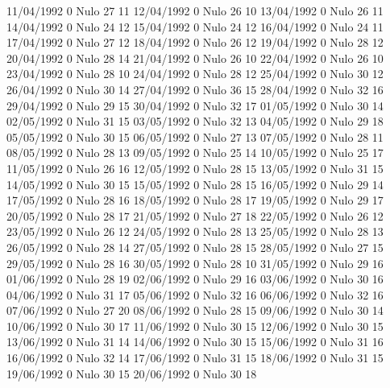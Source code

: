 11/04/1992  0     Nulo    27     11 
12/04/1992  0     Nulo    26     10 
13/04/1992  0     Nulo    26     11 
14/04/1992  0     Nulo    24     12 
15/04/1992  0     Nulo    24     12 
16/04/1992  0     Nulo    24     11 
17/04/1992  0     Nulo    27     12 
18/04/1992  0     Nulo    26     12 
19/04/1992  0     Nulo    28     12 
20/04/1992  0     Nulo    28     14 
21/04/1992  0     Nulo    26     10 
22/04/1992  0     Nulo    26     10 
23/04/1992  0     Nulo    28     10 
24/04/1992  0     Nulo    28     12 
25/04/1992  0     Nulo    30     12 
26/04/1992  0     Nulo    30     14 
27/04/1992  0     Nulo    36     15 
28/04/1992  0     Nulo    32     16 
29/04/1992  0     Nulo    29     15 
30/04/1992  0     Nulo    32     17 
01/05/1992  0     Nulo    30     14 
02/05/1992  0     Nulo    31     15 
03/05/1992  0     Nulo    32     13 
04/05/1992  0     Nulo    29     18 
05/05/1992  0     Nulo    30     15 
06/05/1992  0     Nulo    27     13 
07/05/1992  0     Nulo    28     11 
08/05/1992  0     Nulo    28     13 
09/05/1992  0     Nulo    25     14 
10/05/1992  0     Nulo    25     17 
11/05/1992  0     Nulo    26     16 
12/05/1992  0     Nulo    28     15 
13/05/1992  0     Nulo    31     15 
14/05/1992  0     Nulo    30     15 
15/05/1992  0     Nulo    28     15 
16/05/1992  0     Nulo    29     14 
17/05/1992  0     Nulo    28     16 
18/05/1992  0     Nulo    28     17 
19/05/1992  0     Nulo    29     17 
20/05/1992  0     Nulo    28     17 
21/05/1992  0     Nulo    27     18 
22/05/1992  0     Nulo    26     12 
23/05/1992  0     Nulo    26     12 
24/05/1992  0     Nulo    28     13 
25/05/1992  0     Nulo    28     13 
26/05/1992  0     Nulo    28     14 
27/05/1992  0     Nulo    28     15 
28/05/1992  0     Nulo    27     15 
29/05/1992  0     Nulo    28     16 
30/05/1992  0     Nulo    28     10 
31/05/1992  0     Nulo    29     16 
01/06/1992  0     Nulo    28     19 
02/06/1992  0     Nulo    29     16 
03/06/1992  0     Nulo    30     16 
04/06/1992  0     Nulo    31     17 
05/06/1992  0     Nulo    32     16 
06/06/1992  0     Nulo    32     16 
07/06/1992  0     Nulo    27     20 
08/06/1992  0     Nulo    28     15 
09/06/1992  0     Nulo    30     14 
10/06/1992  0     Nulo    30     17 
11/06/1992  0     Nulo    30     15 
12/06/1992  0     Nulo    30     15 
13/06/1992  0     Nulo    31     14 
14/06/1992  0     Nulo    30     15 
15/06/1992  0     Nulo    31     16 
16/06/1992  0     Nulo    32     14 
17/06/1992  0     Nulo    31     15 
18/06/1992  0     Nulo    31     15 
19/06/1992  0     Nulo    30     15 
20/06/1992  0     Nulo    30     18 
